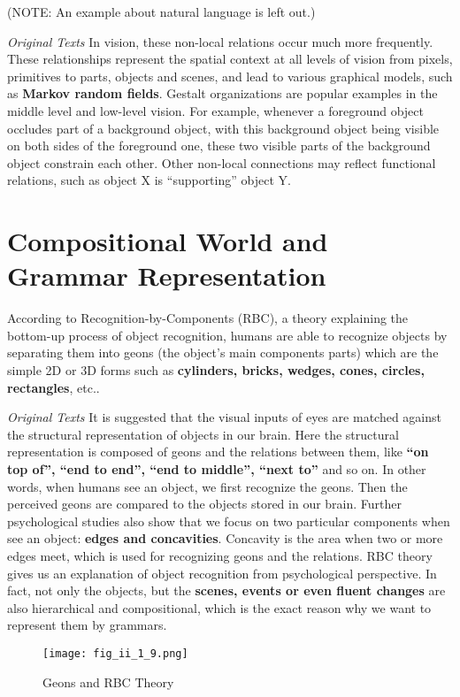\documentclass[../Notes_of_CaRiVaC.tex]{subfiles}
\begin{document}
{\color{red} (NOTE\@: An example about natural language is left out.)}

\begin{textbox}{\textit{Original Texts}}
In vision, these non-local relations occur much more frequently. These
relationships represent the spatial context at all levels of vision from
pixels, primitives to parts, objects and scenes, and lead to various graphical
models, such as \textbf{Markov random fields}. Gestalt organizations are
popular examples in the middle level and low-level vision. For example,
whenever a foreground object occludes part of a background object, with this
background object being visible on both sides of the foreground one, these two
visible parts of the background object constrain each other. Other non-local
connections may reflect functional relations, such as object X is
``supporting'' object Y.
\end{textbox}

\section{Compositional World and Grammar Representation}%
\label{sec:ii.1.6}
According to Recognition-by-Components (RBC)\cite{biederman1987}, a theory
explaining the bottom-up process of object recognition, humans are able to
recognize objects by separating them into geons (the object's main components
parts) which are the simple 2D or 3D forms such as \textbf{cylinders, bricks,
wedges, cones, circles, rectangles}, etc..

\begin{textbox}{\textit{Original Texts}}
It is suggested that the visual inputs of eyes are matched against the
structural representation of objects in our brain. Here the structural
representation is composed of geons and the relations between them, like
\textbf{``on top of'', ``end to end'', ``end to middle'', ``next to''} and so
on. In other words, when humans see an object, we first recognize the geons.
Then the perceived geons are compared to the objects stored in our brain.
Further psychological studies also show that we focus on two particular
components when see an object: \textbf{edges and concavities}. Concavity is the
area when two or more edges meet, which is used for recognizing geons and the
relations. RBC theory gives us an explanation of object recognition from
psychological perspective. In fact, not only the objects, but the
\textbf{scenes, events or even fluent changes} are also hierarchical and
compositional, which is the exact reason why we want to represent them by
grammars.
\end{textbox}
%
\begin{figure}[!htpb]
  \centering
  \texttt{[image: fig\_ii\_1\_9.png]}
  \caption{Geons and RBC Theory}%
  \label{fig:ii.1.9}
\end{figure}
%
\end{document}
